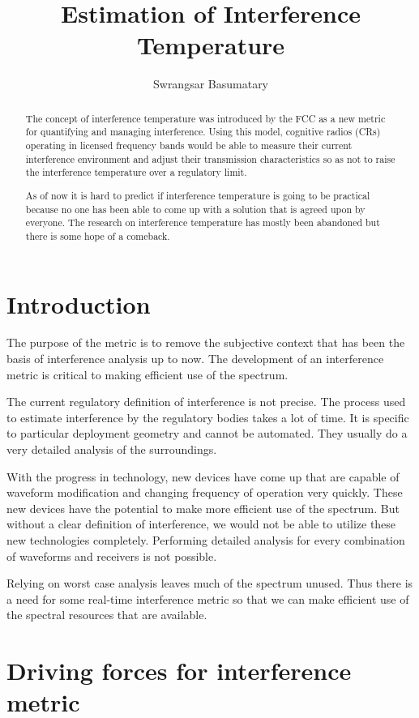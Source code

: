 \documentclass[12pt]{article}
\title{Estimation of Interference Temperature}
\author{Swrangsar Basumatary}
\begin{document}
\maketitle

\begin{abstract}
The concept of interference temperature was introduced by the FCC as a new metric for quantifying and managing interference. Using this model, cognitive radios (CRs) operating in licensed frequency bands would be able to measure their current interference environment and adjust their transmission characteristics so as not to raise the interference temperature over a regulatory limit.

As of now it is hard to predict if interference temperature is going to be practical because no one has been able to come up with a solution that is agreed upon by everyone. The research on interference temperature has mostly been abandoned but there is some hope of a comeback.
\end{abstract}

\section{Introduction}
The purpose of the metric is to remove the subjective context that has been the basis of interference analysis up to now. The development of an interference metric is critical to making efficient use of the spectrum.

The current regulatory definition of interference is not precise. The process used to estimate interference by the regulatory bodies takes a lot of time. It is specific to particular deployment geometry and cannot be automated. They usually do a very detailed analysis of the surroundings.

With the progress in technology, new devices have come up that are capable of waveform modification and changing frequency of operation very quickly. These new devices have the potential to make more efficient use of the spectrum. But without a clear definition of interference, we would not be able to utilize these new technologies completely. Performing detailed analysis for every combination of waveforms and receivers is not possible.

Relying on worst case analysis leaves much of the spectrum unused. Thus there is a need for some real-time interference metric so that we can make efficient use of the spectral resources that are available.

\section{Driving forces for interference metric}
\end{document}
